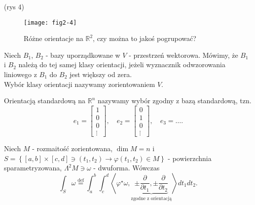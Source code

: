 \documentclass[../main.tex]{subfiles}
\begin{document}
(rys 4)
\begin{figure}[h]
    \centering
    \texttt{[image: fig2-4]}
    \caption{Różne orientacje na $\mathbb{R}^2$, czy można to jakoś pogrupować?}
    \label{fig:fig2-4}
\end{figure}
\begin{definicja}
    Niech $B_1$, $B_2$ - bazy uporządkowane w $V$ - przestrzeń wektorowa. Mówimy, że $B_1$ i $B_2$ należą do tej samej klasy orientacji, jeżeli wyznacznik odwzorowania liniowego z $B_1$ do $B_2$ jest większy od zera.\\
    Wybór klasy orientacji nazywamy zorientowaniem $V$.
\end{definicja}
\begin{definicja}
    Orientacją standardową na $\mathbb{R}^n$ nazywamy wybór zgodny z bazą standardową, tzn.
    \[
        e_1 = \begin{bmatrix} 1\\0\\0\\ \vdots \end{bmatrix},\quad e_2 = \begin{bmatrix} 0\\1\\0\\ \vdots \end{bmatrix},\quad e_3 = \ldots
    .\]
\end{definicja}
\begin{definicja}
    Niech $M$ - rozmaitość zorientowana, $\dim M = n$ i $S = \left\{ [a,b]\times[c,d]\ni (t_1,t_2) \to \varphi(t_1,t_2)\in M \right\}$ - powierzchnia sparametryzowana, $\Lambda^2M\ni\omega$ - dwuforma. Wówczas
    \[
        \int_S \omega \overset{\text{def}}{=} \int_a^b\int_c^d \left<\varphi^\star\omega, \underbrace{\pm \frac{\partial }{\partial t_1} , \pm \frac{\partial }{\partial t_2}}_\text{zgodne z orientacją}\right>dt_1dt_2
    .\]
\end{definicja}
\end{document}
